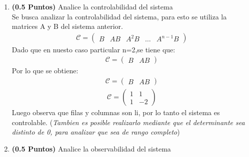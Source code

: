 \begin{enumerate}
    \item \textbf{(0.5 Puntos)} Analice la controlabilidad del sistema\\
    Se busca analizar la controlabilidad del sistema, para esto se utiliza la matrices A y B del sistema anterior.
    \begin{align}
        \mathcal{C} = \begin{pmatrix} B & AB & A^{2}B & \dots & A^{n-1}B \end{pmatrix}
    \end{align}
    Dado que en nuesto caso particular n=2,se tiene que:
    \begin{align}
        \mathcal{C} = \begin{pmatrix} B & AB \end{pmatrix}
    \end{align}
    Por lo que se obtiene:
    \begin{align}
        \mathcal{C} = \begin{pmatrix} B & AB \end{pmatrix}
    \end{align}
    \begin{align}
        \mathcal{C} = \begin{pmatrix} 1 & 1 \\ 1 & -2 \end{pmatrix}
    \end{align}
    Luego observa que filas y columnas son li, por lo tanto el sistema es controlable. (\textit{Tambien es posible realizarlo mediante que el determinante sea distinto de 0, para analizar que sea de rango completo})
    \item \textbf{(0.5 Puntos)} Analice la observabilidad del sistema\\
    

\end{enumerate}

